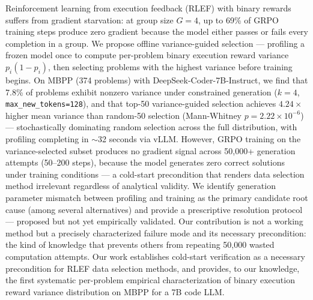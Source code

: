 Reinforcement learning from execution feedback (RLEF) with binary rewards suffers from gradient starvation: at group size $G=4$, up to 69\% of GRPO training steps produce zero gradient because the model either passes or fails every completion in a group. We propose offline variance-guided selection --- profiling a frozen model once to compute per-problem binary execution reward variance $p_i(1-p_i)$, then selecting problems with the highest variance before training begins. On MBPP (374 problems) with DeepSeek-Coder-7B-Instruct, we find that 7.8\% of problems exhibit nonzero variance under constrained generation ($k=4$, \texttt{max\_new\_tokens=128}), and that top-50 variance-guided selection achieves $4.24\times$ higher mean variance than random-50 selection (Mann-Whitney $p=2.22\times10^{-6}$) --- stochastically dominating random selection across the full distribution, with profiling completing in $\sim$32 seconds via vLLM. However, GRPO training on the variance-selected subset produces no gradient signal across 50,000+ generation attempts (50--200 steps), because the model generates zero correct solutions under training conditions --- a cold-start precondition that renders data selection method irrelevant regardless of analytical validity. We identify generation parameter mismatch between profiling and training as the primary candidate root cause (among several alternatives) and provide a prescriptive resolution protocol --- proposed but not yet empirically validated. Our contribution is not a working method but a precisely characterized failure mode and its necessary precondition: the kind of knowledge that prevents others from repeating 50,000 wasted computation attempts. Our work establishes cold-start verification as a necessary precondition for RLEF data selection methods, and provides, to our knowledge, the first systematic per-problem empirical characterization of binary execution reward variance distribution on MBPP for a 7B code LLM.
